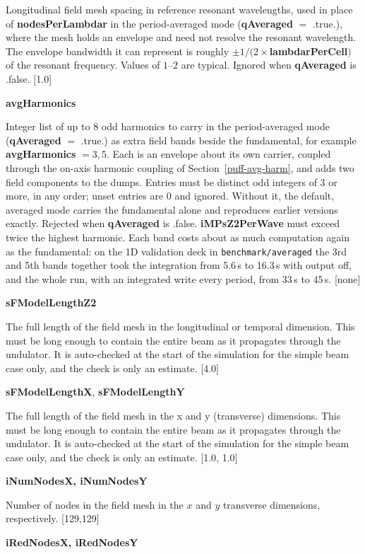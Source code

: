 \documentclass[12pt]{article}%
\begin{document}
Longitudinal field mesh spacing in reference resonant wavelengths, used in place of {\bf nodesPerLambdar} in the period-averaged mode ({\bf qAveraged} $=$ .true.), where the mesh holds an envelope and need not resolve the resonant wavelength. The envelope bandwidth it can represent is roughly $\pm 1/(2\times${\bf lambdarPerCell}$)$ of the resonant frequency. Values of $1$--$2$ are typical. Ignored when {\bf qAveraged} is .false. [1.0]

{\bf avgHarmonics}

Integer list of up to 8 odd harmonics to carry in the period-averaged mode ({\bf qAveraged} $=$ .true.) as extra field bands beside the fundamental, for example {\bf avgHarmonics} $= 3, 5$. Each is an envelope about its own carrier, coupled through the on-axis harmonic coupling of Section~\ref{puff-avg-harm}, and adds two field components to the dumps. Entries must be distinct odd integers of 3 or more, in any order; unset entries are $0$ and ignored. Without it, the default, averaged mode carries the fundamental alone and reproduces earlier versions exactly. Rejected when {\bf qAveraged} is .false. {\bf iMPsZ2PerWave} must exceed twice the highest harmonic. Each band costs about as much computation again as the fundamental: on the 1D validation deck in {\tt benchmark/averaged} the 3rd and 5th bands together took the integration from 5.6\,s to 16.3\,s with output off, and the whole run, with an integrated write every period, from 33\,s to 45\,s. [none]

{\bf sFModelLengthZ2}

The full length of the field mesh in the longitudinal or temporal dimension. This must be long enough to contain the entire beam as it propagates through the undulator. It is auto-checked at the start of the simulation for the simple beam case only, and the check is only an estimate. [4.0]

{\bf sFModelLengthX}, {\bf sFModelLengthY}

The full length of the field mesh in the x and y (transverse) dimensions. This must be long enough to contain the entire beam as it propagates through the undulator. It is auto-checked at the start of the simulation for the simple beam case only, and the check is only an estimate. [1.0, 1.0]

{\bf iNumNodesX, iNumNodesY}

Number of nodes in the field mesh in the $x$ and $y$ transverse dimensions, respectively. [129,129]

{\bf iRedNodesX, iRedNodesY}
\end{document}
